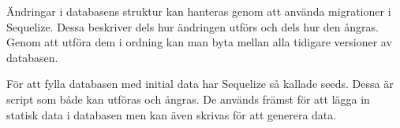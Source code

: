 Ändringar i databasens struktur kan hanteras genom att använda migrationer i Sequelize. Dessa beskriver dels hur ändringen utförs och dels hur den ångras. Genom att utföra dem i ordning kan man byta mellan alla tidigare versioner av databasen. \cite{migrations}

För att fylla databasen med initial data har Sequelize så kallade seeds. Dessa är script som både kan utföras och ångras. De används främst för att lägga in statisk data i databasen men kan även skrivas för att generera data.
